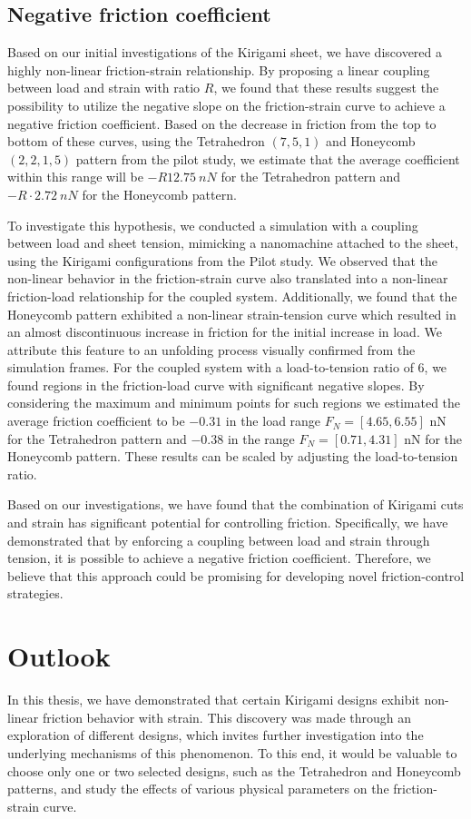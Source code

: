 \subsection{Negative friction coefficient}
Based on our initial investigations of the Kirigami sheet, we have discovered a
highly non-linear friction-strain relationship. By proposing a linear coupling
between load and strain with ratio $R$, we found that these results suggest the
possibility to utilize the negative slope on the friction-strain curve to
achieve a negative friction coefficient. Based on the decrease in friction from the top to bottom of
these curves, using the Tetrahedron $(7,5,1)$ and Honeycomb $(2,2,1,5)$ pattern
from the pilot study, we estimate that the average coefficient within this range
will be $-R\SI{12.75}{nN}$ for the Tetrahedron pattern and
$-R\cdot\SI{2.72}{nN}$ for the Honeycomb pattern.

To investigate this hypothesis, we conducted a simulation with a coupling
between load and sheet tension, mimicking a nanomachine attached to the sheet,
using the Kirigami configurations from the Pilot study. We observed that the non-linear behavior in the friction-strain curve also translated into a non-linear friction-load relationship for the coupled system. Additionally, we found that the Honeycomb pattern exhibited a non-linear strain-tension curve which resulted in an almost discontinuous increase in friction for the initial
increase in load. We attribute this feature to an unfolding process visually
confirmed from the simulation frames. For the coupled system with a
load-to-tension ratio of 6, we found regions in the friction-load curve with
significant negative slopes. By considering the maximum and minimum points for
such regions we estimated the average friction coefficient to be $-0.31$ in the
load range $F_N = [4.65, 6.55]$ nN for the Tetrahedron pattern and $-0.38$ in the
range $F_N = [0.71, 4.31]$ nN for the Honeycomb pattern. These results can be scaled by adjusting the load-to-tension ratio.

Based on our investigations, we have found that the combination of Kirigami cuts and strain has significant potential for controlling friction. Specifically, we have demonstrated that by enforcing a coupling between load and strain through tension, it is possible to achieve a negative friction coefficient. Therefore, we believe that this approach could be promising for developing novel friction-control strategies.


\section{Outlook}
In this thesis, we have demonstrated that certain Kirigami designs exhibit non-linear friction behavior with strain. This discovery was made through an exploration of different designs, which invites further investigation into the underlying mechanisms of this phenomenon. To this end, it would be valuable to choose only one or two selected designs, such as the Tetrahedron and Honeycomb patterns, and study the effects of various physical parameters on the friction-strain curve.

